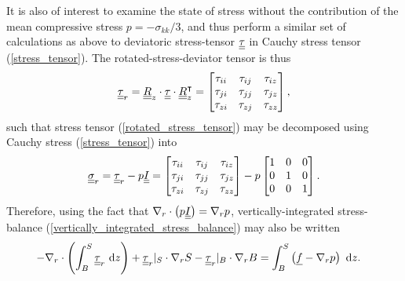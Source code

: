 It is also of interest to examine the state of stress without the contribution of the mean compressive stress $p = -\sigma_{kk} / 3$,  and thus perform a similar set of calculations as above to deviatoric stress-tensor $\underline{\underline{\tau}}$ in Cauchy stress tensor (\ref{stress_tensor}).  The rotated-stress-deviator tensor is thus
\begin{align}
  \label{rotated_stress_deviator_tensor}
  \underline{\underline{\tau}}_r = \underline{\underline{R}}_z \cdot \underline{\underline{\tau}} \cdot \underline{\underline{R}}_z^\intercal
         = \begin{bmatrix}
             \tau_{ii} & \tau_{ij} & \tau_{iz} \\
             \tau_{ji} & \tau_{jj} & \tau_{jz} \\
             \tau_{zi} & \tau_{zj} & \tau_{zz}
           \end{bmatrix},
\end{align}
such that stress tensor (\ref{rotated_stress_tensor}) may be decomposed using Cauchy stress (\ref{stress_tensor}) into
\begin{align*}
  \underline{\underline{\sigma}}_r = \underline{\underline{\tau}}_r - p \underline{\underline{I}}
           = \begin{bmatrix}
               \tau_{ii} & \tau_{ij} & \tau_{iz} \\
               \tau_{ji} & \tau_{jj} & \tau_{jz} \\
               \tau_{zi} & \tau_{zj} & \tau_{zz}
             \end{bmatrix} - 
           p \begin{bmatrix}
               1 & 0 & 0 \\
               0 & 1 & 0 \\
               0 & 0 & 1 
             \end{bmatrix}.
\end{align*}
Therefore, using the fact that $\nabla_r \cdot \big(p \underline{\underline{I}} \big) = \nabla_r p$, vertically-integrated stress-balance (\ref{vertically_integrated_stress_balance}) may also be written
{\footnotesize
\begin{align}
  \label{vertically_integrated_stress_balance_decomposed}
  - \nabla_r \cdot \left( \int_B^S \underline{\underline{\tau}}_r \ \mathrm{d}z \right) + \underline{\underline{\tau}}_r |_S \cdot \nabla_r S - \underline{\underline{\tau}}_r |_B \cdot \nabla_r B &= \int_B^S \left( \underline{f} - \nabla_r p \right) \ \mathrm{d}z.
\end{align}}

